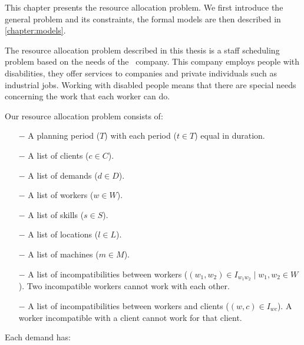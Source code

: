 \documentclass[../thesis.tex]{subfiles}
\begin{document}
This chapter presents the resource allocation problem.
We first introduce the general problem and its constraints, 
the formal models are then described in \autoref{chapter:models}.

The resource allocation problem described in this thesis is a staff scheduling problem based on the needs of the \vone\ company. 
This company employs people with disabilities, they offer services to companies and private individuals such 
as industrial jobs. Working with disabled people means that there are special needs concerning
the work that each worker can do.




Our resource allocation problem consists of:

\begin{itemize}
  \item[$-$] A planning period ($T$) with each period ($t \in T$) equal in duration.
  \item[$-$] A list of clients ($c \in C$). 
  \item[$-$] A list of demands ($d \in D$).
  \item[$-$] A list of workers ($w \in W$). 
  \item[$-$] A list of skills ($s \in S$).
  \item[$-$] A list of locations ($l \in L$).
  \item[$-$] A list of machines ($m \in M$).
  \item[$-$] A list of incompatibilities between workers ($(w_1, w_2) \in I_{w_{1}w_{2}} \mid w_1, w_2 \in W$).
  Two incompatible workers cannot work with each other.  
  \item[$-$] A list of incompatibilities between workers and clients ($(w, c) \in I_{wc}$).
  A worker incompatible with a client cannot work for that client.
\end{itemize}

Each demand has:
\end{document}
